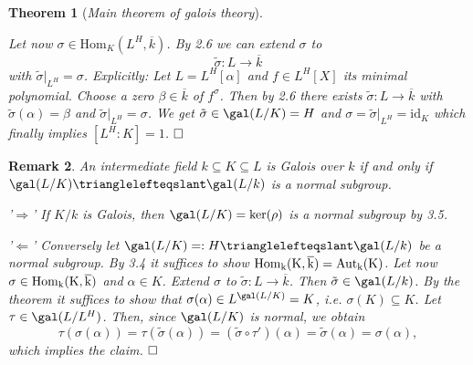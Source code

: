 \documentclass[11pt]{book}
\newtheorem{theorem}{Theorem}[section]
\newtheorem{remark}[theorem]{Remark}
\theoremstyle{nonumberbreak}
\newenvironment{pr}[1][]{\ifthenelse{\equal{#1}{}}{\proof}{\proof[#1]}\rm}{\endproof}
\begin{document}
\begin{spacing}{1.3}
\begin{theorem}[\rm \it Main theorem of galois theory]
\begin{pr}
\begin{compactenum}
\begin{compactitem}
Let now $\sigma \in \textrm{Hom}_{K}(L^H, \overline{k})$. By 2.6 we can extend $\sigma$ to $$\tilde{\sigma}: L \longrightarrow \overline{k}$$ with $\tilde{\sigma}|_{L^H}=\sigma$. Explicitly: Let $L=L^H[\alpha]$ and $f \in L^H[X]$ its minimal polynomial. Choose a zero $\beta \in \overline{k}$ of $f^{\sigma}$. Then by 2.6 there exists $\tilde{\sigma}: L \longrightarrow \overline{k}$ with $\tilde{\sigma}(\alpha)=\beta$ and $\tilde{\sigma}|_{L^H} = \sigma$.
We get $\tilde{\sigma} \in \gal(L/K)=H$ and $\sigma=\tilde{\sigma}|_{L^H}=\textrm{id}_{K}$ which finally implies $[L^H:K]=1$. $\hfill \Box$
\end{compactitem}
\end{compactenum}
\end{pr}
\end{theorem}

\begin{remark} %
An intermediate field $k \subseteq K \subseteq L$ is Galois over $k$ if and only if $\gal(L/K) \trianglelefteqslant \gal(L/k)$ is a normal subgroup.
\begin{pr}
\begin{compactenum}
\item['$\Rightarrow$'] If $K/k$ is Galois, then $\gal(L/K)=\ker(\rho)$ is a normal subgroup by 3.5.
\item['$\Leftarrow$']  Conversely let $\gal(L/K)=:H \trianglelefteqslant \gal(L/k)$ be a normal subgroup. By 3.4 it suffices to show $\rm{Hom}_{k}(K, \overline{k})=\rm{Aut}_{k}(K)$. Let now $\sigma \in \rm{Hom}_{k}(K, \overline{k})$ and $\alpha \in K$. Extend $\sigma$ to $\tilde{\sigma}:L \longrightarrow \overline{k}$. Then $\tilde{\sigma} \in \gal(L/k)$. By the theorem it suffices to show that $\sigma(\alpha) \in L^{\gal(L/K)}=K$, i.e. $\sigma(K) \subseteq K$. Let $\tau \in \gal(L/L^H)$. Then, since $\gal(L/K)$ is normal, we obtain $$ \tau\left(\sigma(\alpha)\right)= \tau\left(\tilde{\sigma}(\alpha)\right)=\left(\tilde{\sigma} \circ \tau'\right)(\alpha)= \tilde{\sigma}(\alpha)=\sigma(\alpha),$$
which implies the claim. $\hfill \Box$

\end{compactenum}

\end{pr}
\end{remark}



\end{spacing}
\end{document}
